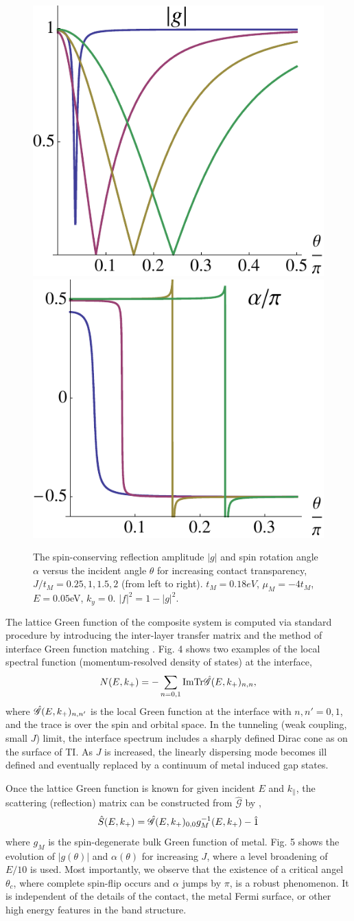 \begin{figure}
\center
\includegraphics[width=.45 \textwidth]{include/la1.pdf}\includegraphics[width=.45 \textwidth]{include/la2.pdf}
\caption{The spin-conserving reflection amplitude $|g|$ and spin rotation angle 
$\alpha$ versus the incident angle $\theta$ for increasing contact transparency,
$J/t_M=0.25, 1, 1.5, 2$ (from left to right). $t_M=0.18eV$, $\mu_M=-4t_M$, $E=0.05$eV, $k_y=0$.
$|f|^2=1-|g|^2$. 
}
\end{figure}

The lattice Green function of the composite system is computed via 
standard procedure by introducing the inter-layer transfer matrix 
and the method of interface Green function matching \cite{gf}. 
Fig. 4 shows two examples of the local spectral function 
(momentum-resolved density of states) at the interface,
\[ 
N(E,k_{+})=-\sum_{n=0,1}\mathrm{Im Tr}\hat{\mathscr{G}}(E,k_{+})_{n,n}, 
\]
where $\hat{\mathscr{G}}(E,k_{+})_{n,n'}$ is 
the local Green function at the interface with $n,n'=0,1$, and  
the trace is over the spin and orbital space. 
In the tunneling (weak coupling, small $J$) limit, the interface spectrum includes 
a sharply defined Dirac cone as on the surface of TI. As $J$ is increased, 
the linearly dispersing mode becomes ill defined and eventually replaced 
by a continuum of metal induced gap states.

Once the lattice Green function is known for given incident $E$ and $k_{\parallel}$, 
the scattering (reflection) matrix can be constructed from $\hat{\mathscr{G}}$ by \cite{gf},
\[
\hat{S}(E,k_{+})=\hat{\mathscr{G}}(E,k_{+})_{0,0}g_M^{-1}(E,k_{+})-\hat{1}
\]
where $g_M$ is the spin-degenerate bulk Green function of metal. Fig. 5 shows
the evolution of $|g(\theta)|$ and $\alpha(\theta)$ for increasing $J$, where 
a level broadening of $E/10$ is used. Most importantly,
we observe that the existence of a critical angel $\theta_c$, 
where complete spin-flip occurs and $\alpha$ jumps by $\pi$, is a robust phenomenon. 
It is independent of the details of the contact, the metal Fermi 
surface, or other high energy features in the band structure.

